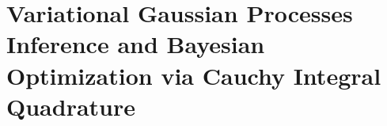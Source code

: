 \chapter{Variational Gaussian Processes Inference and Bayesian Optimization via Cauchy Integral Quadrature}
\label{chapter:ciq}








